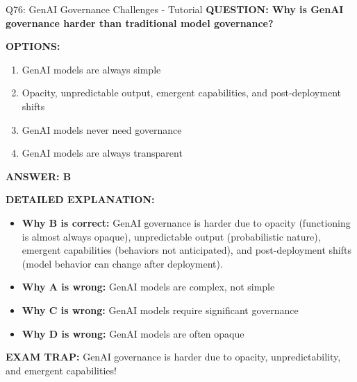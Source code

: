 \documentclass[8pt]{beamer}
\begin{document}
	\begin{frame}{Q76: GenAI Governance Challenges - Tutorial}
		\fontsize{6.5}{7.5}\selectfont
		\textbf{QUESTION: Why is GenAI governance harder than traditional model governance?}
		
		\vspace{0.1cm}
		\textbf{OPTIONS:}
		\begin{enumerate}
			\item GenAI models are always simple
			\item Opacity, unpredictable output, emergent capabilities, and post-deployment shifts
			\item GenAI models never need governance
			\item GenAI models are always transparent
		\end{enumerate}
		
		\vspace{0.1cm}
		\textcolor{myblue}{\textbf{ANSWER: B}}
		
		\vspace{0.1cm}
		\textbf{DETAILED EXPLANATION:}
		\begin{itemize}
			\item \textbf{Why B is correct:} GenAI governance is harder due to opacity (functioning is almost always opaque), unpredictable output (probabilistic nature), emergent capabilities (behaviors not anticipated), and post-deployment shifts (model behavior can change after deployment).
			\item \textbf{Why A is wrong:} GenAI models are complex, not simple
			\item \textbf{Why C is wrong:} GenAI models require significant governance
			\item \textbf{Why D is wrong:} GenAI models are often opaque
		\end{itemize}
		
		\textcolor{myred}{\textbf{EXAM TRAP:}} GenAI governance is harder due to \textcolor{myblue}{opacity, unpredictability, and emergent capabilities}!
	\end{frame}
	
\end{document}
